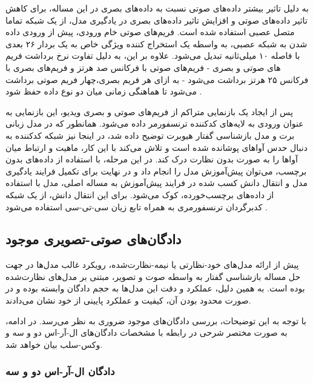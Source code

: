 به دلیل تاثیر بیشتر داده‌های صوتی نسبت به داده‌های بصری در این مساله، برای کاهش تاثیر داده‌های صوتی و افزایش تاثیر داده‌های بصری در یادگیری مدل، از یک شبکه تماما متصل عصبی استفاده شده است. فریم‌های صوتی خام ورودی، پیش از ورودی داده شدن به شبکه عصبی، به واسطه یک استخراج کننده ویژگی خاص
به یک بردار ۲۶ بعدی با فاصله ۱۰ میلی‌ثانیه تبدیل می‌شود. علاوه بر این، به دلیل تفاوت نرخ برداشت فریم های صوتی و بصری - فریم‌های صوتی با فرکانس صد هرتز و فریم‌های بصری با فرکانس ۲۵ هرتز برداشت می‌شود - به ازای هر فریم بصری،چهار فریم صوتی برداشت می‌شود تا هماهنگی زمانی میان دو نوع داده حفظ شود
\cite{shi2022learning}
.

پس از ایجاد یک بازنمایی متراکم از فریم‌های صوتی و بصری ویدیو، این بازنمایی به عنوان ورودی به لایه‌های کدکننده ترنسفورمر داده می‌شود. همانطور که در مدل زبانی برت و مدل بازشناسی گفتار هیوبرت توضیح داده شد، در اینجا نیز شبکه کدکننده به دنبال حدس آواهای پوشانده شده است و تلاش می‌کند با این کار، ماهیت و ارتباط میان آواها را به صورت بدون نظارت درک کند. در این مرحله، با استفاده از داده‌های بدون برچسب، می‌توان پیش‌آموزش
مدل را انجام داد و در نهایت برای تکمیل فرایند یادگیری مدل و انتقال دانش کسب شده در فرایند پیش‌آموزش به مساله اصلی، مدل با استفاده از داده‌های برچسب‌خورده، کوک می‌شود. برای این انتقال دانش، از یک شبکه کدبرگردان
ترنسفورمری به همراه تابع زیان سی-تی-سی
 استفاده می‌شود
\cite{shi2022learning}
 .
 
 \subsection{دادگان‌های صوتی-تصویری موجود}
 
 پیش از ارائه مدل‌های خود-نظارتی یا نیمه-نظارت‌شده، رویکرد غالب مدل‌ها در جهت حل مساله بازشناسی گفتار به واسطه صوت و تصویر، مبتنی بر مدل‌های نظارت‌شده بوده است. به همین دلیل، عملکرد و دقت این مدل‌ها به حجم دادگان وابسته بوده و در صورت محدود بودن آن، کیفیت و عملکرد پایینی از خود نشان می‌دادند.
 
 با توجه به این توضیحات، بررسی دادگان‌های موجود ضروری به نظر می‌رسد. در ادامه، به صورت مختصر شرحی در رابطه با مشخصات دادگان‌های ال-آر-اس دو و سه
و وکس-سلب
بیان خواهد شد.
   
\subsubsection{دادگان ال-آر-اس دو و سه}

